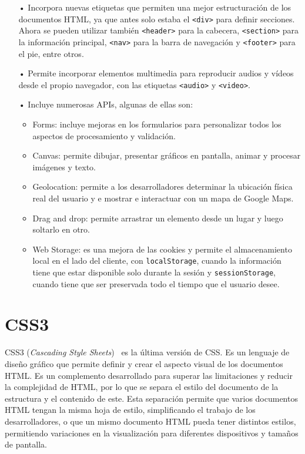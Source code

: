 \documentclass[a4paper, 12pt]{book}
\begin{document}
	\begin{itemize}
	\item[•] Incorpora nuevas etiquetas que permiten una mejor estructuración de los documentos HTML, ya que antes solo estaba el \texttt{<div>} para definir secciones. 
	Ahora se pueden utilizar también \texttt{<header>} para la cabecera, \texttt{<section>} para la información principal, \texttt{<nav>} para la barra de navegación y \texttt{<footer>} para el pie, entre otros.
	\item[•] Permite incorporar elementos multimedia para reproducir audios y vídeos desde el propio navegador, con las etiquetas \texttt{<audio>} y \texttt{<video>}.
	\item[•] Incluye numerosas APIs, algunas de ellas son:
		\begin{itemize}
		\item Forms: incluye mejoras en los formularios para personalizar todos los aspectos de procesamiento y validación.
		\item Canvas: permite dibujar, presentar gráficos en pantalla, animar y procesar imágenes y texto.
		\item Geolocation: permite a los desarrolladores determinar la ubicación física real del usuario y e mostrar e interactuar con un mapa de Google Maps.
		\item Drag and drop: permite arrastrar un elemento desde un lugar y luego soltarlo en otro.
		\item Web Storage: es una mejora de las cookies y permite el almacenamiento local en el lado del cliente, con \texttt{localStorage}, cuando la información tiene que estar disponible solo durante la sesión y \texttt{sessionStorage}, cuando tiene que ser preservada todo el tiempo que el usuario desee.
		\end{itemize}
	\end{itemize}


\section{CSS3} 
\label{sec:CSS3}

CSS3 (\emph{Cascading Style Sheets})~\cite{gauchat2012gran} es la última versión de CSS. 
Es un lenguaje de diseño gráfico que permite definir y crear el aspecto visual de los documentos HTML. 
Es un complemento desarrollado para superar las limitaciones y reducir la complejidad de HTML, por lo que se separa el estilo del documento de la estructura y el contenido de este. 
Esta separación permite que varios documentos HTML tengan la misma hoja de estilo, simplificando el trabajo de los desarrolladores, o que un mismo documento HTML pueda tener distintos estilos, permitiendo variaciones en la visualización para diferentes dispositivos y tamaños de pantalla.
\end{document}
